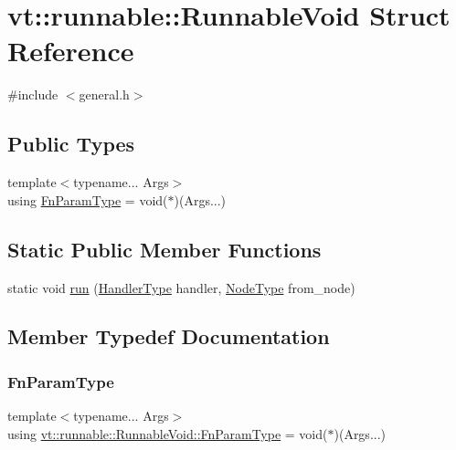 \hypertarget{structvt_1_1runnable_1_1_runnable_void}{}\section{vt\+:\+:runnable\+:\+:Runnable\+Void Struct Reference}
\label{structvt_1_1runnable_1_1_runnable_void}


{\ttfamily \#include $<$general.\+h$>$}

\subsection*{Public Types}
\begin{DoxyCompactItemize}
\item 
{\footnotesize template$<$typename... Args$>$ }\\using \hyperlink{structvt_1_1runnable_1_1_runnable_void_a30afc667067328b9bc264b206ac607ba}{Fn\+Param\+Type} = void($\ast$)(Args...)
\end{DoxyCompactItemize}
\subsection*{Static Public Member Functions}
\begin{DoxyCompactItemize}
\item 
static void \hyperlink{structvt_1_1runnable_1_1_runnable_void_a96cf878b2fac0bfc8625c4b9aa1051c8}{run} (\hyperlink{namespacevt_af64846b57dfcaf104da3ef6967917573}{Handler\+Type} handler, \hyperlink{namespacevt_a866da9d0efc19c0a1ce79e9e492f47e2}{Node\+Type} from\+\_\+node)
\end{DoxyCompactItemize}


\subsection{Member Typedef Documentation}
\mbox{\label{structvt_1_1runnable_1_1_runnable_void_a30afc667067328b9bc264b206ac607ba}} 
\subsubsection{\texorpdfstring{Fn\+Param\+Type}{FnParamType}}
{\footnotesize\ttfamily template$<$typename... Args$>$ \\
using \hyperlink{structvt_1_1runnable_1_1_runnable_void_a30afc667067328b9bc264b206ac607ba}{vt\+::runnable\+::\+Runnable\+Void\+::\+Fn\+Param\+Type} =  void($\ast$)(Args...)}



